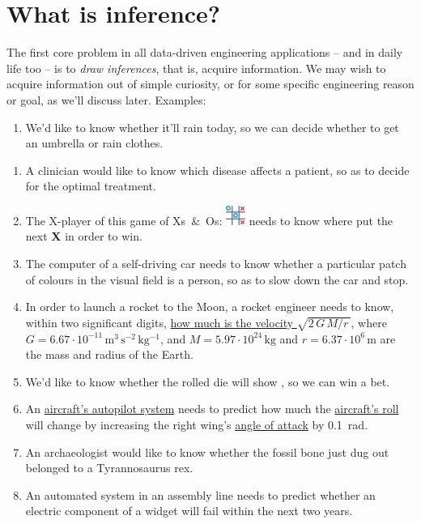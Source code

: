 \documentclass[
  a4paper,
  DIV=11,
  numbers=noendperiod,
  oneside]{scrreprt}
\providecommand{\tightlist}{%
  \setlength{\itemsep}{0pt}\setlength{\parskip}{0pt}}\usepackage{longtable,booktabs,array}
\begin{document}
\hypertarget{what-is-inference}{%
\section{What is inference?}\label{what-is-inference}}

The first core problem in all data-driven engineering applications --
and in daily life too -- is to \emph{draw inferences}, that is, acquire
information. We may wish to acquire information out of simple curiosity,
or for some specific engineering reason or goal, as we'll discuss later.
Examples:

\begin{enumerate}
\def\labelenumi{\arabic{enumi}.}
\tightlist
\item
  We'd like to know whether it'll rain today, so we can decide whether
  to get an umbrella or rain clothes.
\end{enumerate}

\begin{enumerate}
\def\labelenumi{\arabic{enumi}.}
\setcounter{enumi}{1}
\item
  A clinician would like to know which disease affects a patient, so as
  to decide for the optimal treatment.
\item
  The X-player of this game of Xs~\&~Os:
  \includegraphics[width=0.05\textwidth,height=\textheight]{XsOs.png}
  needs to know where put the next {\textbf{X}} in order to win.
\item
  The computer of a self-driving car needs to know whether a particular
  patch of colours in the visual field is a person, so as to slow down
  the car and stop.
\item
  In order to launch a rocket to the Moon, a rocket engineer needs to
  know, within two significant digits,
  \href{http://nasaphysics.cet.edu/escape-velocity.html}{how much is the
  velocity \(\sqrt{2\,G\,M/r\,}\)}, where
  \(G=6.67 \cdot 10^{-11}\,\mathrm{m^3\,s^{-2}\,kg^{-1}}\), and
  \(M = 5.97 \cdot 10^{24}\,\mathrm{kg}\) and
  \(r = 6.37 \cdot 10^{6}\,\mathrm{m}\) are the mass and radius of the
  Earth.
\item
  We'd like to know whether the rolled die will show ,
  so we can win a bet.
\item
  An
  \href{https://aerospaceamerica.aiaa.org/features/a-i-in-the-cockpit}{aircraft's
  autopilot system} needs to predict how much the
  \href{https://www.grc.nasa.gov/www/k-12/VirtualAero/BottleRocket/airplane/roll.html}{aircraft's
  roll} will change by increasing the right wing's
  \href{https://www.grc.nasa.gov/www/k-12/VirtualAero/BottleRocket/airplane/incline.html}{angle
  of attack} by 0.1~rad.
\item
  An archaeologist would like to know whether the fossil bone just dug
  out belonged to a Tyrannosaurus rex.
\item
  An automated system in an assembly line needs to predict whether an
  electric component of a widget will fail within the next two years.
\end{enumerate}
\end{document}
